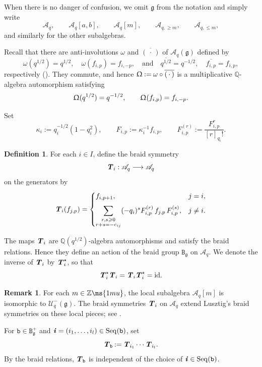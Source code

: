 \documentclass[12pt, leqno]{amsart}
\numberwithin{equation}{section}
\theoremstyle{plain}
\theoremstyle{definition}
\newtheorem{remark}[lemma]{Remark}
\newtheorem{definition}[lemma]{Definition}
\renewcommand{\le}{\leqslant}
\renewcommand{\ge}{\geqslant}
\newcommand{\seteq}{\mathbin{:=}}
\newcommand{\g}{\mathfrak{g}}
\newcommand{\Q}{\mathbb{Q}}
\newcommand{\Z}{\mathbb{Z}\ms{1mu}}
\newcommand{\ii}{ \textbf{\textit{i}}}
\newcommand{\calU}{\mathcal{U}}
\newcommand{\scrA}{\mathscr{A}}
\newcommand{\ttB}{\mathtt{B}}
\newcommand{\ttb}{\mathtt{b}}
\newcommand{\qtq}[1][{and}]{\quad\text{{#1}}\quad}
\newcommand{\TT}{ \textbf{\textit{T}}}
\newcommand{\Seq}{\mathrm{Seq}}
\begin{document}
When there is no danger of confusion, we omit $\g$ from the notation
and simply write
\[
\scrA_q,\qquad \scrA_q[a,b],\qquad \scrA_q[m],\qquad \scrA_{q,\ge m},\qquad \scrA_{q,\le m},
\]
and similarly for the other subalgebras.


 
Recall that there are anti-involutions  
$\omega$ and $\overline{(\,\cdot\,)}$ of $\scrA_q(\g)$ defined by 
\[
\omega(q^{1/2})=q^{1/2}, \quad \omega(f_{i,p})=f_{i,-p},
\qtq 
\overline{q^{1/2}}=q^{-1/2}, \quad \overline{f_{i,p}}=f_{i,p},
\]
respectively (\cite[(2.3)]{KKOP24B}).  They commute, and hence
$\Upomega \seteq \omega\circ\overline{(\,\cdot\,)}$ is a multiplicative
$\mathbb Q$-algebra automorphism satisfying
\[
\Upomega (q^{1/2})=q^{-1/2}, \qquad
\Upomega (f_{i,p})=f_{i,-p}. 
\]
 

Set
\[
\kappa_i\seteq q_i^{-1/2}(1-q_i^2), \qquad F_{i,p}\seteq\kappa_i^{-1}f_{i,p}, \qquad F_{i,p}^{(r)} \seteq \frac{F_{i,p}^r}{[r]_{q_i}!}.
\]

\begin{definition} \cite{KKOP21B,JLO2,KKOP24B}
For each $i\in I$, define the braid symmetry
\[
\TT_i:\scrA_q\longrightarrow\scrA_q
\]
on the generators by
\[
\TT_i(f_{j,p}) =
\begin{cases}
f_{i,p+1}, & j=i,\\[2mm]
\displaystyle \sum_{\substack{r,s\ge0\\ r+s=-c_{ij}}} (-q_i)^s F_{i,p}^{(r)}\,f_{j,p}\,F_{i,p}^{(s)}, & j\ne i.
\end{cases}
\]
\end{definition}

The maps $\TT_i$ are  $\Q(q^{1/2})$-algebra automorphisms and satisfy the braid
relations.  Hence they define an action of the braid group
$\ttB_\g$ on $\scrA_q$.  We denote the inverse of $\TT_i$ by
$\TT_i^\star$, so that
\[
\TT_i^\star \TT_i=\TT_i\TT_i^\star={\rm id}.
\]



\begin{remark}
For each $m\in\Z$, the local subalgebra
$\scrA_q[m]$ is isomorphic to $\calU_q^-(\g)$.
The braid symmetries $\TT_i$ on $\scrA_q$ extend Lusztig's
braid symmetries on these local pieces; see
\cite{KKOP24,KKOP24B}.
\end{remark}

For $\ttb\in\ttB_\g^+$ and
$\ii=(i_1,\ldots,i_l)\in\Seq(\ttb)$, set
\[
\TT_{\ttb} \seteq \TT_{i_1}\cdots \TT_{i_l}.
\]
By the braid relations, $\TT_{\ttb}$ is independent of the choice of
$\ii\in\Seq(\ttb)$.
\end{document}
